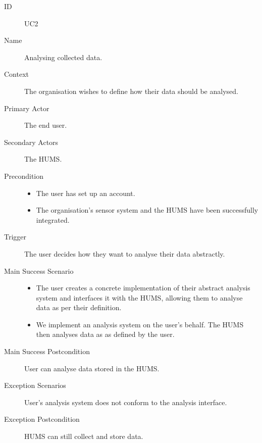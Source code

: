 \documentclass[10pt,a4paper]{article}
\begin{document}
\vspace{\baselineskip}

\begin{description}
	\item[ID] UC2
	\item[Name] Analysing collected data.
	\item[Context] The organisation wishes to define how their data should be
	               analysed.
	\item[Primary Actor] The end user.
	\item[Secondary Actors] The HUMS.
	\item[Precondition]
			\begin{itemize}
				\item The user has set up an account.
				\item The organisation's sensor system and the HUMS have been
				      successfully integrated.
			\end{itemize}
	\item[Trigger] The user decides how they want to analyse their data
	               abstractly.
	\item[Main Success Scenario]
			\begin{itemize}
				\item The user creates a concrete implementation of their abstract
				      analysis system and interfaces it with the HUMS, allowing them to
				      analyse data as per their definition.
				\item We implement an analysis system on the user's behalf. The HUMS
				      then analyses data as as defined by the user.
			\end{itemize}
	\item[Main Success Postcondition] User can analyse data stored in the HUMS.
	\item[Exception Scenarios] User's analysis system does not conform to the
			analysis interface.
	\item[Exception Postcondition] HUMS can still collect and store data.
\end{description}

\vspace{\baselineskip}
\end{document}
